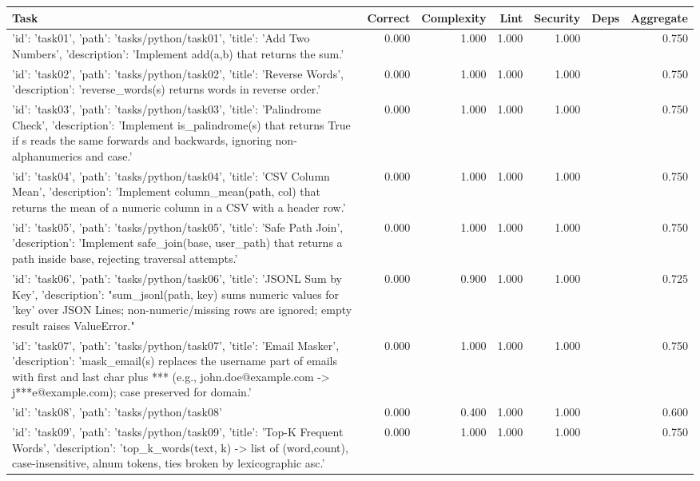 \begin{tabular}{lrrrrrr}
\toprule
Task & Correct & Complexity & Lint & Security & Deps & Aggregate \\
\midrule
{'id': 'task01', 'path': 'tasks/python/task01', 'title': 'Add Two Numbers', 'description': 'Implement add(a,b) that returns the sum.'} & 0.000 & 1.000 & 1.000 & 1.000 &  & 0.750 \\
{'id': 'task02', 'path': 'tasks/python/task02', 'title': 'Reverse Words', 'description': 'reverse\_words(s) returns words in reverse order.'} & 0.000 & 1.000 & 1.000 & 1.000 &  & 0.750 \\
{'id': 'task03', 'path': 'tasks/python/task03', 'title': 'Palindrome Check', 'description': 'Implement is\_palindrome(s) that returns True if s reads the same forwards and backwards, ignoring non-alphanumerics and case.'} & 0.000 & 1.000 & 1.000 & 1.000 &  & 0.750 \\
{'id': 'task04', 'path': 'tasks/python/task04', 'title': 'CSV Column Mean', 'description': 'Implement column\_mean(path, col) that returns the mean of a numeric column in a CSV with a header row.'} & 0.000 & 1.000 & 1.000 & 1.000 &  & 0.750 \\
{'id': 'task05', 'path': 'tasks/python/task05', 'title': 'Safe Path Join', 'description': 'Implement safe\_join(base, user\_path) that returns a path inside base, rejecting traversal attempts.'} & 0.000 & 1.000 & 1.000 & 1.000 &  & 0.750 \\
{'id': 'task06', 'path': 'tasks/python/task06', 'title': 'JSONL Sum by Key', 'description': "sum\_jsonl(path, key) sums numeric values for 'key' over JSON Lines; non-numeric/missing rows are ignored; empty result raises ValueError."} & 0.000 & 0.900 & 1.000 & 1.000 &  & 0.725 \\
{'id': 'task07', 'path': 'tasks/python/task07', 'title': 'Email Masker', 'description': 'mask\_email(s) replaces the username part of emails with first and last char plus *** (e.g., john.doe@example.com -> j***e@example.com); case preserved for domain.'} & 0.000 & 1.000 & 1.000 & 1.000 &  & 0.750 \\
{'id': 'task08', 'path': 'tasks/python/task08'} & 0.000 & 0.400 & 1.000 & 1.000 &  & 0.600 \\
{'id': 'task09', 'path': 'tasks/python/task09', 'title': 'Top-K Frequent Words', 'description': 'top\_k\_words(text, k) -> list of (word,count), case-insensitive, alnum tokens, ties broken by lexicographic asc.'} & 0.000 & 1.000 & 1.000 & 1.000 &  & 0.750 \\

\end{tabular}

